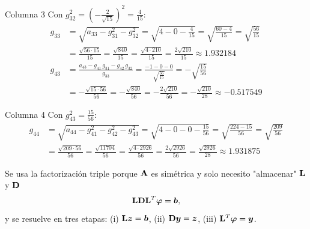 Columna 3
Con $g_{32}^2 = \left(-\frac{2}{\sqrt{15}}\right)^2 = \frac{4}{15}$:
\begin{align*}
	g_{33} &= \sqrt{a_{33} - g_{31}^2 - g_{32}^2} = \sqrt{4 - 0 - \tfrac{4}{15}} = \sqrt{\tfrac{60 - 4}{15}} = \sqrt{\tfrac{56}{15}}\\
	&= \frac{\sqrt{56\cdot 15}}{15} = \frac{\sqrt{840}}{15} = \frac{\sqrt{4\cdot 210}}{15} = \frac{2\sqrt{210}}{15} \approx 1.932184\\
	g_{43} &= \frac{a_{43} - g_{41}\,g_{31} - g_{42}\,g_{32}}{g_{33}} = \frac{-1 - 0 - 0}{\sqrt{\frac{56}{15}}}
	= -\sqrt{\tfrac{15}{56}}\\
	&= -\frac{\sqrt{15\cdot 56}}{56} = -\frac{\sqrt{840}}{56} = -\frac{2\sqrt{210}}{56} = -\frac{\sqrt{210}}{28} \approx -0.517549
\end{align*}

Columna 4
Con $g_{43}^2 = \frac{15}{56}$:
\begin{align*}
	g_{44} &= \sqrt{a_{44} - g_{41}^2 - g_{42}^2 - g_{43}^2} = \sqrt{4 - 0 - 0 - \tfrac{15}{56}} = \sqrt{\tfrac{224 - 15}{56}} = \sqrt{\tfrac{209}{56}}\\
	&= \frac{\sqrt{209\cdot 56}}{56} = \frac{\sqrt{11704}}{56} = \frac{\sqrt{4\cdot 2926}}{56} = \frac{2\sqrt{2926}}{56} = \frac{\sqrt{2926}}{28} \approx 1.931875
\end{align*}


Se usa la factorización triple porque $\mathbf{A}$ es simétrica y solo necesito "almacenar" $\mathbf{L}$ y $\mathbf{D}$
\[
\mathbf{L}\mathbf{D}\mathbf{L}^T\bm{\varphi}= \bm{b},
\]
y se resuelve en tres etapas: (i) $\mathbf{L}\bm{z} = \bm{b}$, (ii) $\mathbf{D}\bm{y} = \bm{z}$,
(iii) $\mathbf{L}^T\bm{\varphi} = \bm{y}$.


